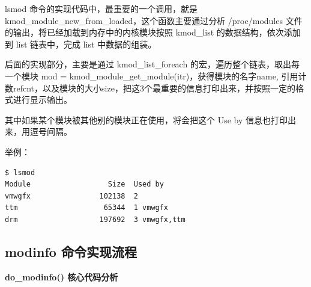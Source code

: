 lsmod 命令的实现代码中，最重要的一个调用，就是
kmod\_module\_new\_from\_loaded，这个函数主要通过分析 /proc/modules
文件的输出，将已经加载到内存中的内核模块按照 kmod\_list
的数据结构，依次添加到 list 链表中，完成 list 中数据的组装。

后面的实现部分，主要是通过 kmod\_list\_foreach
的宏，遍历整个链表，取出每一个模块 mod =
kmod\_module\_get\_module(itr)，获得模块的名字name,
引用计数refcnt，以及模块的大小size，把这3个最重要的信息打印出来，并按照一定的格式进行显示输出。

其中如果某个模块被其他别的模块正在使用，将会把这个 Use by
信息也打印出来，用逗号间隔。

举例：

{\begin{shaded}\begin{verbatim}
$ lsmod
Module                  Size  Used by
vmwgfx                102138  2 
ttm                    65344  1 vmwgfx
drm                   197692  3 vmwgfx,ttm
\end{verbatim}\end{shaded}}
\subsection{modinfo 命令实现流程}

\textbf{do\_modinfo() 核心代码分析}

